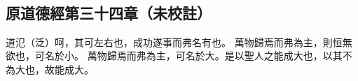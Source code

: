 ﻿%
%

\chapter{~}

\section{原道德經第三十四章（未校註）}

\begin{withgezhu}

\zhsong


道氾（\textcolor{tongjia-color}{泛}）呵，其可左右也，\textcolor{tongjia-color}{成功遂事而弗名有也}。
\textcolor{tongjia-color}{萬物歸焉而弗為主}，則\textcolor{tongjia-color}{恒}無欲也，可名於小。
萬物歸焉而弗為主，可名於大。是以聖人之能成大也，以其不為大也，故能成大。

\end{withgezhu}
